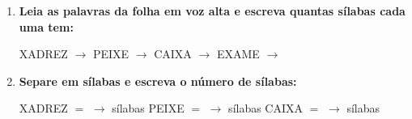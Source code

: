 \begin{exercicio}
\begin{enumerate}[resume]
  \item \textbf{Leia as palavras da folha em voz alta e escreva quantas sílabas cada uma tem:}

  \begin{center}
  XADREZ $\rightarrow$ \underline{\hspace{1cm}} \quad PEIXE $\rightarrow$ \underline{\hspace{1cm}} \quad CAIXA $\rightarrow$ \underline{\hspace{1cm}} \quad EXAME $\rightarrow$ \underline{\hspace{1cm}}
  \end{center}

  \item \textbf{Separe em sílabas e escreva o número de sílabas:}
  \begin{center}
  XADREZ $=$ \underline{\hspace{1.2cm}} $\rightarrow$ \underline{\hspace{0.8cm}} sílabas \quad PEIXE $=$ \underline{\hspace{1.2cm}} $\rightarrow$ \underline{\hspace{0.8cm}} sílabas \quad CAIXA $=$ \underline{\hspace{1.2cm}} $\rightarrow$ \underline{\hspace{0.8cm}} sílabas
  \end{center}

\end{enumerate}

\end{exercicio}



